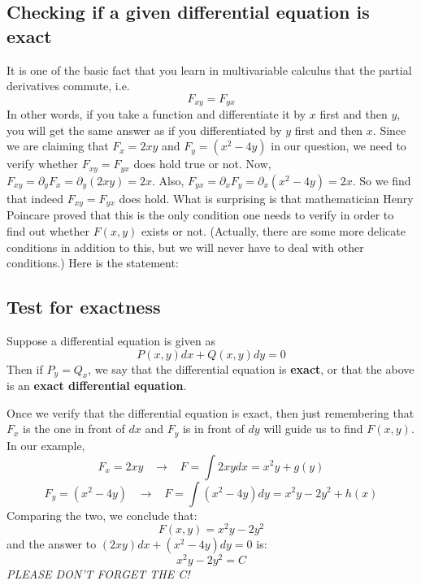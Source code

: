 \documentclass[12pt]{report}
\begin{document}
\subsection*{Checking if a given differential equation is exact }
It is one of the basic fact that you learn in multivariable calculus that the partial derivatives commute, i.e.
$$F_{xy} = F_{yx}$$
In other words, if you take a function and differentiate it by $x$ first and then $y$, you will get the same answer as if you differentiated by $y$ first and then $x$. Since we are claiming that $F_x = 2xy$ and $F_y = (x^2-4y)$ in our question, we need to verify whether $F_{xy} = F_{yx}$ does hold true or not.
Now, $F_{xy} = \partial_y F_x = \partial_y (2xy) = 2x $. Also, $F_{yx} = \partial_x F_y = \partial_x (x^2-4y) = 2x$. So we find that indeed $F_{xy} = F_{yx}$ does hold. What is surprising is that mathematician Henry Poincare proved that this is the only condition one needs to verify in order to find out whether $F(x,y)$ exists or not. (Actually, there are some more delicate conditions in addition to this, but we will never have to deal with other conditions.) Here is the statement:

\subsection*{Test for exactness}
Suppose a differential equation is given as
$$P(x,y) dx + Q(x,y) dy =0$$
Then if $P_y = Q_x$, we say that the differential equation is \textbf{exact}, or that the above is an \textbf{exact differential equation}.

Once we verify that the differential equation is exact, then just remembering that $F_x$ is the one in front of $dx$ and $F_y$ is in front of $dy$ will guide us to find $F(x,y)$. In our example,
$$F_x = 2xy \; \; \; \rightarrow \; \; \; F= \int 2xy dx = x^2y +g(y)$$
$$F_y = (x^2-4y)\; \; \; \rightarrow \; \; \; F= \int (x^2-4y) dy = x^2 y -2y^2 + h(x)$$
Comparing the two, we conclude that:
$$F(x,y) = x^2 y - 2y^2$$
and the answer to $ (2xy) dx + (x^2 - 4y) dy =0$ is:
$$x^2 y - 2y^2 = C$$
\textit{PLEASE DON'T FORGET THE C!}
\end{document}
